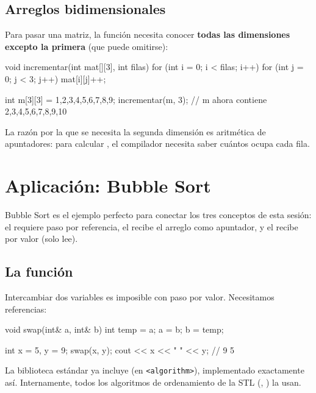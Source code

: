 \documentclass[12pt, oneside]{article}
\begin{document}
\subsection{Arreglos bidimensionales}

Para pasar una matriz, la función necesita conocer \textbf{todas las dimensiones
excepto la primera} (que puede omitirse):

\begin{codigo}[caption={Arreglo 2D como parámetro}]
void incrementar(int mat[][3], int filas) {
    for (int i = 0; i < filas; i++)
        for (int j = 0; j < 3; j++)
            mat[i][j]++;
}

int m[3][3] = {{1,2,3},{4,5,6},{7,8,9}};
incrementar(m, 3);
// m ahora contiene {{2,3,4},{5,6,7},{8,9,10}}
\end{codigo}

La razón por la que se necesita la segunda dimensión es aritmética de apuntadores:
para calcular , el compilador necesita saber cuántos 
ocupa cada fila.

\section{Aplicación: Bubble Sort}

Bubble Sort es el ejemplo perfecto para conectar los tres conceptos de esta sesión:
el  requiere paso por referencia, el  recibe el arreglo
como apuntador, y el  recibe por valor (solo lee).

\subsection{La función }

Intercambiar dos variables es imposible con paso por valor. Necesitamos referencias:

\begin{codigo}[caption={swap: el ejemplo canónico de paso por referencia}]
void swap(int& a, int& b) {
    int temp = a;
    a = b;
    b = temp;
}

int x = 5, y = 9;
swap(x, y);
cout << x << " " << y;  // 9 5
\end{codigo}

\begin{consejo}
  La biblioteca estándar ya incluye  (en \texttt{<algorithm>}),
  implementado exactamente así. Internamente, todos los algoritmos de ordenamiento
  de la STL (, ) la usan.
\end{consejo}
\end{document}
